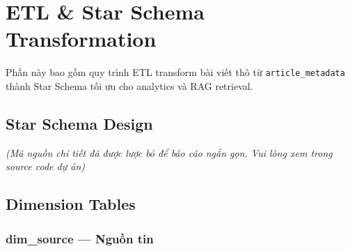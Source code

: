 \hypertarget{etl-star-schema-transformation}{%
\section{ETL \& Star Schema
Transformation}}

Phần này bao gồm quy trình ETL transform bài viết thô từ
\texttt{article\_metadata} thành Star Schema tối ưu cho analytics và RAG
retrieval.

\hypertarget{star-schema-design}{%
\subsection{Star Schema Design}}

\emph{(Mã nguồn chi tiết đã được lược bỏ để báo cáo ngắn gọn. Vui lòng
xem trong source code dự án)}

\hypertarget{dimension-tables}{%
\subsection{Dimension Tables}}

\hypertarget{dim_source-nguux1ed3n-tin}{%
\subsubsection{dim\_source --- Nguồn
tin}}

\begin{Shaded}
\begin{Highlighting}[]
 
 \NormalTok{,}
\NormalTok{(}\NormalTok{) }  \NormalTok{,}
\NormalTok{(}\NormalTok{) }  \NormalTok{,}
\NormalTok{(}\NormalTok{),}
\NormalTok{(}\NormalTok{) } \NormalTok{,}
\NormalTok{(}\NormalTok{) } \NormalTok{,}
  \NormalTok{,}
\NormalTok{);}
\end{Highlighting}
\end{Shaded}

